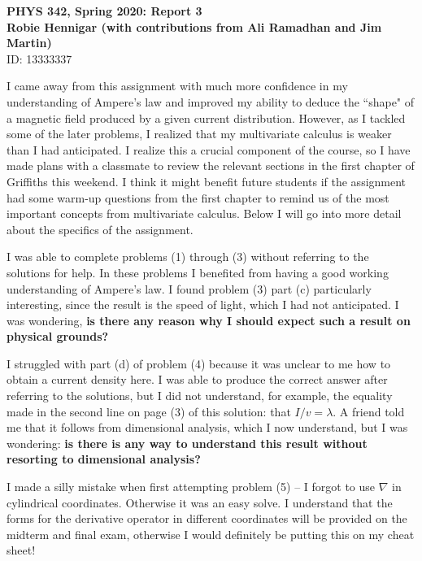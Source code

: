 \documentclass[11pt,usenames,dvipsnames]{article}
\begin{document}
\begin{center}
  \large\textbf{PHYS 342, Spring 2020: Report 3} \\ \vspace{10 pt}
  \textbf{Robie Hennigar (with contributions from Ali Ramadhan and Jim Martin)} \\
  \normalsize ID: 13333337 \\
\end{center}

I came away from this assignment with much more confidence in my understanding of Ampere's law and improved my ability to deduce the ``shape" of a magnetic field produced by a given current distribution.  However, as I tackled some of the later problems, I realized that my multivariate calculus is weaker than I had anticipated.  I realize this a crucial component of the course, so I have made plans with a classmate to review the relevant sections in the first chapter of Griffiths this weekend. I think it might benefit future students if the assignment had some warm-up questions from the first chapter to remind us of the most important concepts from multivariate calculus. Below I will go into more detail about the specifics of the assignment.

I was able to complete problems (1) through (3) without referring to the solutions for help. In these problems I benefited from having a good working understanding of Ampere's law. I found problem (3) part (c) particularly interesting, since the result is the speed of light, which I had not anticipated.  I was wondering, \textbf{ is there any reason why I should expect such a result on physical grounds?}

I struggled with part (d) of problem (4) because it was unclear to me how to obtain a current density here.  I was able to produce the correct answer after referring to the solutions, but I did not understand, for example, the equality made in the second line on page (3) of this solution: that $I/v = \lambda$.  A friend told me that it follows from dimensional analysis, which I now understand, but I was wondering: \textbf{ is there is any way to understand this result without resorting to dimensional analysis?}

I made a silly mistake when first attempting problem (5) -- I forgot to use $\nabla$ in cylindrical coordinates. Otherwise it was an easy solve. I understand that the forms for the derivative operator in different coordinates will be provided on the midterm and final exam, otherwise I would definitely be putting this on my cheat sheet!
\end{document}
